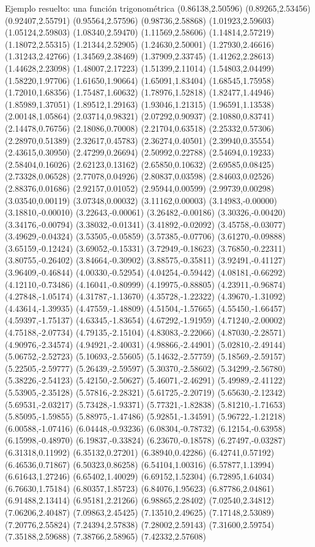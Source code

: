 \documentclass[11pt,a4paper]{article}
\begin{document}
\begin{fmex}{Ejemplo resuelto: una función trigonométrica}
(0.86138,2.50596) (0.89265,2.53456) (0.92407,2.55791) (0.95564,2.57596) (0.98736,2.58868) (1.01923,2.59603) (1.05124,2.59803) (1.08340,2.59470) (1.11569,2.58606) (1.14814,2.57219) (1.18072,2.55315) (1.21344,2.52905) (1.24630,2.50001) (1.27930,2.46616) (1.31243,2.42766) (1.34569,2.38469) (1.37909,2.33745) (1.41262,2.28613) (1.44628,2.23098) (1.48007,2.17223) (1.51399,2.11014) (1.54803,2.04499) (1.58220,1.97706) (1.61650,1.90664) (1.65091,1.83404) (1.68545,1.75958) (1.72010,1.68356) (1.75487,1.60632) (1.78976,1.52818) (1.82477,1.44946) (1.85989,1.37051) (1.89512,1.29163) (1.93046,1.21315) (1.96591,1.13538) (2.00148,1.05864) (2.03714,0.98321) (2.07292,0.90937) (2.10880,0.83741) (2.14478,0.76756) (2.18086,0.70008) (2.21704,0.63518) (2.25332,0.57306) (2.28970,0.51389) (2.32617,0.45783) (2.36274,0.40501) (2.39940,0.35554) (2.43615,0.30950) (2.47299,0.26694) (2.50992,0.22788) (2.54694,0.19233) (2.58404,0.16026) (2.62123,0.13162) (2.65850,0.10632) (2.69585,0.08425) (2.73328,0.06528) (2.77078,0.04926) (2.80837,0.03598) (2.84603,0.02526) (2.88376,0.01686) (2.92157,0.01052) (2.95944,0.00599) (2.99739,0.00298) (3.03540,0.00119) (3.07348,0.00032) (3.11162,0.00003) (3.14983,-0.00000) (3.18810,-0.00010) (3.22643,-0.00061) (3.26482,-0.00186) (3.30326,-0.00420) (3.34176,-0.00794) (3.38032,-0.01341) (3.41892,-0.02092) (3.45758,-0.03077) (3.49629,-0.04324) (3.53505,-0.05859) (3.57385,-0.07706) (3.61270,-0.09888) (3.65159,-0.12424) (3.69052,-0.15331) (3.72949,-0.18623) (3.76850,-0.22311) (3.80755,-0.26402) (3.84664,-0.30902) (3.88575,-0.35811) (3.92491,-0.41127) (3.96409,-0.46844) (4.00330,-0.52954) (4.04254,-0.59442) (4.08181,-0.66292) (4.12110,-0.73486) (4.16041,-0.80999) (4.19975,-0.88805) (4.23911,-0.96874) (4.27848,-1.05174) (4.31787,-1.13670) (4.35728,-1.22322) (4.39670,-1.31092) (4.43614,-1.39935) (4.47559,-1.48809) (4.51504,-1.57665) (4.55450,-1.66457) (4.59397,-1.75137) (4.63345,-1.83654) (4.67292,-1.91959) (4.71240,-2.00002) (4.75188,-2.07734) (4.79135,-2.15104) (4.83083,-2.22066) (4.87030,-2.28571) (4.90976,-2.34574) (4.94921,-2.40031) (4.98866,-2.44901) (5.02810,-2.49144) (5.06752,-2.52723) (5.10693,-2.55605) (5.14632,-2.57759) (5.18569,-2.59157) (5.22505,-2.59777) (5.26439,-2.59597) (5.30370,-2.58602) (5.34299,-2.56780) (5.38226,-2.54123) (5.42150,-2.50627) (5.46071,-2.46291) (5.49989,-2.41122) (5.53905,-2.35128) (5.57816,-2.28321) (5.61725,-2.20719) (5.65630,-2.12342) (5.69531,-2.03217) (5.73428,-1.93371) (5.77321,-1.82838) (5.81210,-1.71653) (5.85095,-1.59855) (5.88975,-1.47486) (5.92851,-1.34591) (5.96722,-1.21218) (6.00588,-1.07416) (6.04448,-0.93236) (6.08304,-0.78732) (6.12154,-0.63958) (6.15998,-0.48970) (6.19837,-0.33824) (6.23670,-0.18578) (6.27497,-0.03287) (6.31318,0.11992) (6.35132,0.27201) (6.38940,0.42286) (6.42741,0.57192) (6.46536,0.71867) (6.50323,0.86258) (6.54104,1.00316) (6.57877,1.13994) (6.61643,1.27246) (6.65402,1.40029) (6.69152,1.52304) (6.72895,1.64034) (6.76630,1.75184) (6.80357,1.85723) (6.84076,1.95623) (6.87786,2.04861) (6.91488,2.13414) (6.95181,2.21266) (6.98865,2.28402) (7.02540,2.34812) (7.06206,2.40487) (7.09863,2.45425) (7.13510,2.49625) (7.17148,2.53089) (7.20776,2.55824) (7.24394,2.57838) (7.28002,2.59143) (7.31600,2.59754) (7.35188,2.59688) (7.38766,2.58965) (7.42332,2.57608) 
\end{fmex}
\end{document}
